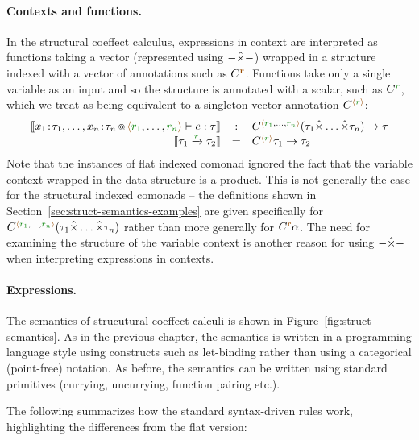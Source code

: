 \paragraph{Contexts and functions.}
In the structural coeffect calculus, expressions in context are interpreted as functions taking
a vector (represented using $-\hat{\times}-$) wrapped in a structure indexed with a vector of annotations
such as $\ctyp{\aclrd{\textbf{r}}}$. Functions take only a single variable as an input and so the
structure is annotated with a scalar, such as $\ctyp{\cclrd{r}}$, which we treat as being equivalent
to a singleton vector annotation $\ctyp{\alift{\cclrd{r}}}$:
%
\begin{equation*}
\begin{array}{rcl}
\sem{\coctx{x_1\!:\!\tau_1, \ldots, x_n\!:\!\tau_n}{ \alift{\cclrd{r_1}, \ldots, \cclrd{r_n}} } \vdash e : \tau} 
  &:& \ctyp{ \alift{\cclrd{r_1}, \ldots, \cclrd{r_n}} }{(\tau_1 \xtimes \ldots \xtimes \tau_n)} \rightarrow \tau\\
\sem{\tau_1 \xrightarrow{\cclrd{r}} \tau_2} &=& \ctyp{\alift{\cclrd{r}}}{\tau_1} \rightarrow \tau_2
\end{array}
\end{equation*}
%
Note that the instances of flat indexed comonad ignored the fact that the variable 
context wrapped in the data structure is a product. This is not generally the case for the 
structural indexed comonads -- the definitions shown in Section~\ref{sec:struct-semantics-examples}
are given specifically for $\ctyp{ \alift{\cclrd{r_1}, \ldots, \cclrd{r_n}} }{(\tau_1 \xtimes \ldots \xtimes \tau_n)}$
rather than more generally for $\ctyp{\aclrd{\textbf{r}}}{\alpha}$. The need for examining the structure
of the variable context is another reason for using $-\hat{\times}-$ when interpreting expressions in contexts.

\paragraph{Expressions.}
The semantics of strucutural coeffect calculi is shown in Figure~\ref{fig:struct-semantics}. As in
the previous chapter, the semantics is written in a programming language style using constructs
such as let-binding rather than using a categorical (point-free) notation. As before, the semantics
can be written using standard primitives (currying, uncurrying, function pairing etc.).

The following summarizes how the standard syntax-driven rules work, highlighting the differences
from the flat version:

